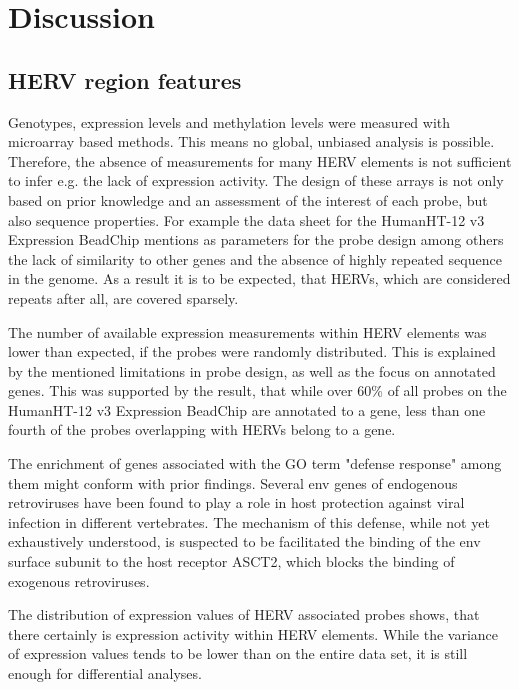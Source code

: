\documentclass[a4paper,12pt,twoside,openright]{article}
\let\oldsection\section
\def\section{\cleardoublepage\oldsection}
\begin{document}
\newpage
\section{Discussion}
\label{Discussion}

\subsection{HERV region features}
\label{Discussion:HERV region features}

Genotypes, expression levels and methylation levels were measured with microarray based methods. This means no global, unbiased analysis is possible. Therefore, the absence of measurements for many HERV elements is not sufficient to infer e.g. the lack of expression activity. The design of these arrays is not only based on prior knowledge and an assessment of the interest of each probe, but also sequence properties. For example the data sheet for the HumanHT-12 v3 Expression BeadChip\cite{HumanHT} mentions as parameters for the probe design among others the lack of similarity to other genes and the absence of highly repeated sequence in the genome. As a result it is to be expected, that HERVs, which are considered repeats after all, are covered sparsely. 

The number of available expression measurements within HERV elements was lower than expected, if the probes were randomly distributed. This is explained by the mentioned limitations in probe design, as well as the focus on annotated genes. This was supported by the result, that while over 60\% of all probes on the HumanHT-12 v3 Expression BeadChip are annotated to a gene, less than one fourth of the probes overlapping with HERVs belong to a gene.

The enrichment of genes associated with the GO term "defense response" among them might conform with prior findings. Several env genes of endogenous retroviruses have been found to play a role in host protection against viral infection in different vertebrates\cite{Malfavon-Borja2015}. The mechanism of this defense, while not yet exhaustively understood, is suspected to be facilitated the binding of the env surface subunit to the host receptor ASCT2, which blocks the binding of exogenous retroviruses\cite{Malfavon-Borja2015}. 

The distribution of expression values of HERV associated probes shows, that there certainly is expression activity within HERV elements. While the variance of expression values tends to be lower than on the entire data set, it is still enough for differential analyses. 
\end{document}
